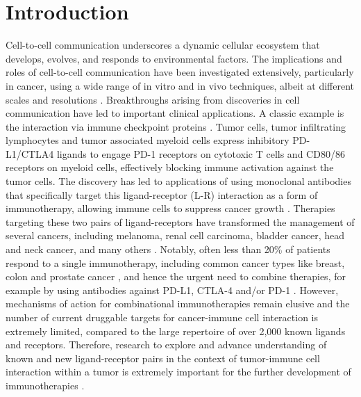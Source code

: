 \section{Introduction}
\label{Sec:2.1_intro}	%
Cell-to-cell communication underscores a dynamic cellular ecosystem that develops, evolves, and responds to environmental factors. The implications and roles of cell-to-cell communication have been investigated extensively, particularly in cancer, using a wide range of in vitro and in vivo techniques, albeit at different scales and resolutions \cite{brucher2014cell}. Breakthroughs arising from discoveries in cell communication have led to important clinical applications. A classic example is the interaction via immune checkpoint proteins \cite{pardoll2012blockade}. Tumor cells, tumor infiltrating lymphocytes and tumor associated myeloid cells express inhibitory PD-L1/CTLA4 ligands to engage PD-1 receptors on cytotoxic T cells and CD80/86 receptors on myeloid cells, effectively blocking immune activation against the tumor cells. The discovery has led to applications of using monoclonal antibodies that specifically target this ligand-receptor (L-R) interaction as a form of immunotherapy, allowing immune cells to suppress cancer growth \cite{weiner2012antibody}. Therapies targeting these two pairs of ligand-receptors have transformed the management of several cancers, including melanoma, renal cell carcinoma, bladder cancer, head and neck cancer, and many others \cite{ott2017combination}. Notably, often less than 20\% of patients respond to a single immunotherapy, including common cancer types like breast, colon and prostate cancer \cite{ott2017combination}, and hence the urgent need to combine therapies, for example by using antibodies against PD-L1, CTLA-4 and/or PD-1 \cite{ott2017combination}. However, mechanisms of action for combinational immunotherapies remain elusive \cite{wei2019combination} and the number of current druggable targets for cancer-immune cell interaction is extremely limited, compared to the large repertoire of over 2,000 known ligands and receptors. Therefore, research to explore and advance understanding of known and new ligand-receptor pairs in the context of tumor-immune cell interaction within a tumor is extremely important for the further development of immunotherapies \cite{weiner2012antibody, helmy2013cancer}. 

